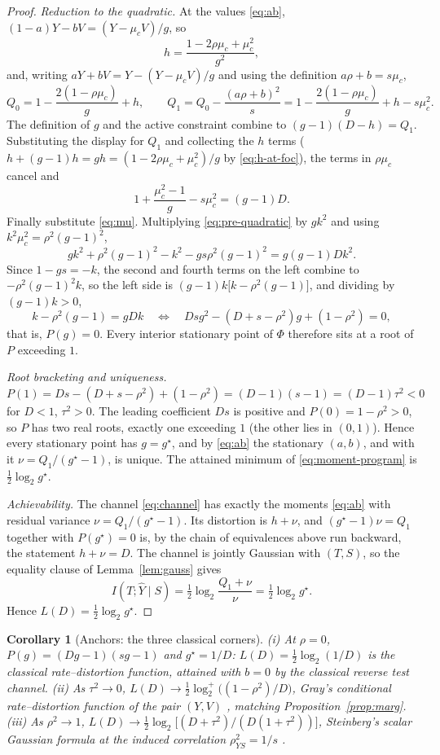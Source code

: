 ﻿\documentclass[11pt,onecolumn]{IEEEtran}
\newtheorem{corollary}[theorem]{Corollary}
\newcommand{\hY}{\widehat{Y}}
\begin{document}
\begin{proof}
\emph{Reduction to the quadratic.} At the values \eqref{eq:ab},
$(1-a)Y-bV=(Y-\mu_cV)/g$, so
\begin{equation}
h=\frac{1-2\rho\mu_c+\mu_c^2}{g^2},
\label{eq:h-at-foc}
\end{equation}
and, writing $aY+bV=Y-(Y-\mu_cV)/g$ and using the definition
$a\rho+b=s\mu_c$,
\[
Q_0=1-\frac{2(1-\rho\mu_c)}{g}+h,
\qquad
Q_1=Q_0-\frac{(a\rho+b)^2}{s}
=1-\frac{2(1-\rho\mu_c)}{g}+h-s\mu_c^2 .
\]
The definition of $g$ and the active constraint combine to
$(g-1)(D-h)=Q_1$. Substituting the display for $Q_1$ and collecting
the $h$ terms ($h+(g-1)h=gh=(1-2\rho\mu_c+\mu_c^2)/g$ by
\eqref{eq:h-at-foc}), the terms in $\rho\mu_c$ cancel and
\begin{equation}
1+\frac{\mu_c^2-1}{g}-s\mu_c^2=(g-1)D .
\label{eq:pre-quadratic}
\end{equation}
Finally substitute \eqref{eq:mu}. Multiplying
\eqref{eq:pre-quadratic} by $gk^2$ and using
$k^2\mu_c^2=\rho^2(g-1)^2$,
\[
gk^2+\rho^2(g-1)^2-k^2-gs\rho^2(g-1)^2=g(g-1)Dk^2 .
\]
Since $1-gs=-k$, the second and fourth terms on the left combine to
$-\rho^2(g-1)^2k$, so the left side is
$(g-1)k\bigl[k-\rho^2(g-1)\bigr]$, and dividing by $(g-1)k>0$,
\[
k-\rho^2(g-1)=gDk
\quad\Longleftrightarrow\quad
Dsg^2-(D+s-\rho^2)g+(1-\rho^2)=0,
\]
that is, $P(g)=0$. Every interior stationary point of $\Phi$ therefore
sits at a root of $P$ exceeding $1$.

\emph{Root bracketing and uniqueness.}
$P(1)=Ds-(D+s-\rho^2)+(1-\rho^2)=(D-1)(s-1)=(D-1)\tau^2<0$ for $D<1$,
$\tau^2>0$. The leading coefficient $Ds$ is positive and
$P(0)=1-\rho^2>0$, so $P$ has two real roots, exactly one exceeding
$1$ (the other lies in $(0,1)$). Hence every stationary point has
$g=g^\star$, and by \eqref{eq:ab} the stationary $(a,b)$, and with it
$\nu=Q_1/(g^\star-1)$, is unique. The attained minimum of
\eqref{eq:moment-program} is $\tfrac12\log_2 g^\star$.

\emph{Achievability.} The channel \eqref{eq:channel} has exactly the
moments \eqref{eq:ab} with residual variance $\nu=Q_1/(g^\star-1)$. Its
distortion is $h+\nu$, and $(g^\star-1)\nu=Q_1$ together with
$P(g^\star)=0$ is, by the chain of equivalences above run backward,
the statement $h+\nu=D$. The channel is jointly Gaussian with $(T,S)$,
so the equality clause of Lemma~\ref{lem:gauss} gives
\[
I(T;\hY\mid S)=\tfrac12\log_2\frac{Q_1+\nu}{\nu}=\tfrac12\log_2 g^\star .
\]
Hence $L(D)=\tfrac12\log_2 g^\star$.
\end{proof}

\begin{corollary}[Anchors: the three classical corners]\label{cor:anchors}
(i) At $\rho=0$, $P(g)=(Dg-1)(sg-1)$ and $g^\star=1/D$:
$L(D)=\tfrac12\log_2(1/D)$ is the classical rate--distortion function,
attained with $b=0$ by the classical reverse test channel.
(ii) As $\tau^2\to0$,
$L(D)\to\tfrac12\log_2^{+}\bigl((1-\rho^2)/D\bigr)$, Gray's
conditional rate--distortion function of the pair $(Y,V)$
\cite{gray1973}, matching Proposition~\ref{prop:marg}.
(iii) As $\rho^2\to1$,
$L(D)\to\tfrac12\log_2\bigl[(D+\tau^2)/(D(1+\tau^2))\bigr]$,
Steinberg's scalar Gaussian formula at the induced correlation
$\rho_{YS}^2=1/s$ \cite{steinberg2009}.
\end{corollary}
\end{document}
